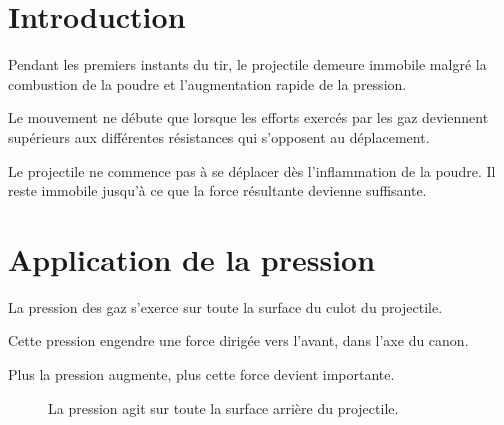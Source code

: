 
\section{Introduction}

Pendant les premiers instants du tir, le projectile demeure immobile malgré la
combustion de la poudre et l'augmentation rapide de la pression.

Le mouvement ne débute que lorsque les efforts exercés par les gaz deviennent
supérieurs aux différentes résistances qui s'opposent au déplacement.

\begin{aretenir}

Le projectile ne commence pas à se déplacer dès l'inflammation de la poudre.
Il reste immobile jusqu'à ce que la force résultante devienne suffisante.

\end{aretenir}

\section{Application de la pression}

La pression des gaz s'exerce sur toute la surface du culot du projectile.

Cette pression engendre une force dirigée vers l'avant, dans l'axe du canon.

Plus la pression augmente, plus cette force devient importante.

\begin{figure}[htbp]
\centering


\caption{La pression agit sur toute la surface arrière du projectile.}
\label{fig:pression_projectile}

\end{figure}

